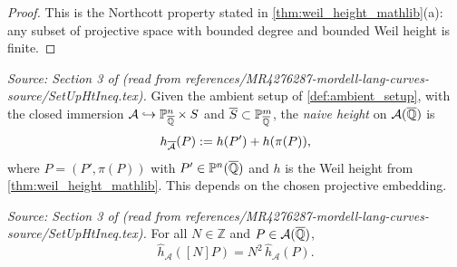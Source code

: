 \begin{proof}
  This is the Northcott property stated in \cref{thm:weil_height_mathlib}(a): any
  subset of projective space with bounded degree and bounded Weil height is finite.
\end{proof}

\begin{definition}
  \label{def:height_fib}
  \textit{Source: Section 3 of \cite{MR4276287-mordell-lang-curves} (read from references/MR4276287-mordell-lang-curves-source/SetUpHtIneq.tex).}
  Given the ambient setup of \cref{def:ambient_setup}, with the closed immersion
  \(\mathcal{A} \hookrightarrow \mathbb{P}^n_{\overline{\mathbb{Q}}} \times S\) and
  \(\overline{S} \subset \mathbb{P}^m_{\overline{\mathbb{Q}}}\), the \emph{naive height} on
  \(\mathcal{A}(\overline{\mathbb{Q}})\) is
  \[
    h_{\overline{\mathcal{A}}}(P) := h(P') + h(\pi(P)),
  \]
  where \(P = (P',\pi(P))\) with \(P' \in \mathbb{P}^n(\overline{\mathbb{Q}})\) and \(h\) is
  the Weil height from \cref{thm:weil_height_mathlib}.
  This depends on the chosen projective embedding.
\end{definition}

\begin{proposition}
  \label{prop:nt_quadratic}
  \textit{Source: Section 3 of \cite{MR4276287-mordell-lang-curves} (read from references/MR4276287-mordell-lang-curves-source/SetUpHtIneq.tex).}
  For all \(N \in \mathbb{Z}\) and \(P \in \mathcal{A}(\overline{\mathbb{Q}})\),
  \[
    \hat{h}_{\mathcal{A}}([N]P) = N^2\, \hat{h}_{\mathcal{A}}(P).
  \]
\end{proposition}

